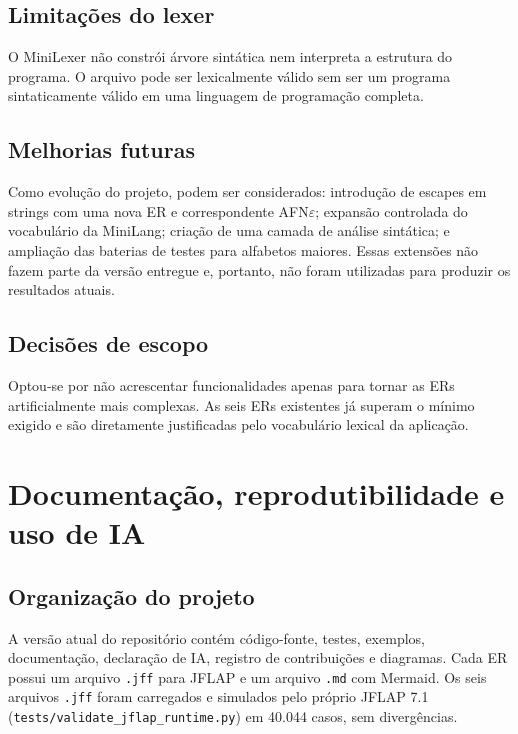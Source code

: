\documentclass[12pt,a4paper,oneside]{report}
\begin{document}
\section{Limitações do lexer}

O MiniLexer não constrói árvore sintática nem interpreta a estrutura do programa. O arquivo pode ser lexicalmente válido sem ser um programa sintaticamente válido em uma linguagem de programação completa.

\section{Melhorias futuras}

Como evolução do projeto, podem ser considerados: introdução de escapes em strings com uma nova ER e correspondente AFN$\varepsilon$; expansão controlada do vocabulário da MiniLang; criação de uma camada de análise sintática; e ampliação das baterias de testes para alfabetos maiores. Essas extensões não fazem parte da versão entregue e, portanto, não foram utilizadas para produzir os resultados atuais.

\section{Decisões de escopo}

Optou-se por não acrescentar funcionalidades apenas para tornar as ERs artificialmente mais complexas. As seis ERs existentes já superam o mínimo exigido e são diretamente justificadas pelo vocabulário lexical da aplicação.



\chapter{Documentação, reprodutibilidade e uso de IA}

\section{Organização do projeto}

A versão atual do repositório contém código-fonte, testes, exemplos, documentação, declaração de IA, registro de contribuições e diagramas. Cada ER possui um arquivo \texttt{.jff} para JFLAP e um arquivo \texttt{.md} com Mermaid. Os seis arquivos \texttt{.jff} foram carregados e simulados pelo próprio JFLAP 7.1 (\texttt{tests/validate\_jflap\_runtime.py}) em 40.044 casos, sem divergências.
\end{document}

